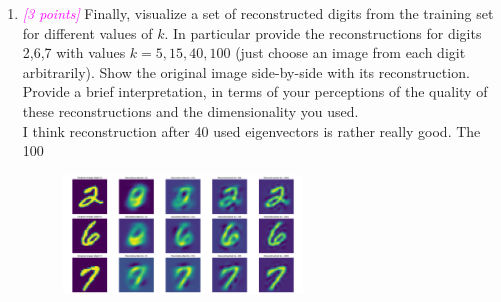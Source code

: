 \documentclass{article}
\newcommand{\1}{\mathbf{1}}
\newcommand{\points}[1]{\small\textcolor{magenta}{\emph{[#1 points]}} \normalsize}
\begin{document}
\begin{enumerate}
    \item \points{3} Finally, visualize a set of reconstructed digits from the training set for different values of $k$. In particular provide the reconstructions for digits 2,6,7 with values $k=5,15,40,100$ (just choose an image from each digit arbitrarily). Show the original image side-by-side with its reconstruction.  Provide a brief interpretation, in terms of your perceptions of the quality of these reconstructions and the dimensionality you used.\\
    I think reconstruction after 40 used eigenvectors is rather really good. The 100
    \begin{figure}[h!]
    \centering 
    \includegraphics[width=0.6\textwidth]{HW3/HW3_plots/A6c_Digits.png}
    \end{figure}
    
\end{enumerate}

\end{document}
